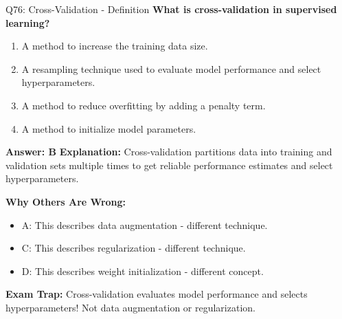 \documentclass[8pt]{beamer}
\begin{document}
	\begin{frame}{Q76: Cross-Validation - Definition}
		\fontsize{6.5}{7.5}\selectfont
		\textbf{What is cross-validation in supervised learning?}
		
		\begin{enumerate}
			\item A method to increase the training data size.
			\item A resampling technique used to evaluate model performance and select hyperparameters.
			\item A method to reduce overfitting by adding a penalty term.
			\item A method to initialize model parameters.
		\end{enumerate}
		
		\vspace{0.05cm}
		\textcolor{myblue}{\textbf{Answer: B}}
		\vspace{0.05cm}
		\textcolor{myblue}{\textbf{Explanation:}} Cross-validation partitions data into training and validation sets multiple times to get reliable performance estimates and select hyperparameters.
		
		\vspace{0.05cm}
		\textcolor{myred}{\textbf{Why Others Are Wrong:}}
		\begin{itemize}
			\item \textcolor{myred}{A:} This describes data augmentation - different technique.
			\item \textcolor{myred}{C:} This describes regularization - different technique.
			\item \textcolor{myred}{D:} This describes weight initialization - different concept.
		\end{itemize}
		
		\textcolor{myred}{\textbf{Exam Trap:}} Cross-validation evaluates \textcolor{myblue}{model performance} and selects \textcolor{myblue}{hyperparameters}! Not data augmentation or regularization.
	\end{frame}
	
\end{document}
